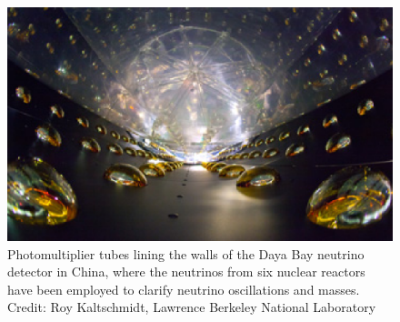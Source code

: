 \documentclass[12pt]{iopart}
\begin{document}
\begin{figure}[htbp]
\centering
 \includegraphics[bb=0 0 360 220, width=5in]{Fig6-dayabay-hr.eps}
 \caption{Photomultiplier tubes lining the walls of the Daya Bay neutrino detector in China, where the neutrinos from six nuclear reactors have been employed to clarify neutrino oscillations and masses. Credit: Roy Kaltschmidt, Lawrence Berkeley National Laboratory \label{Fig6-dayabay-hr.eps}}
 \end{figure}
\end{document}
